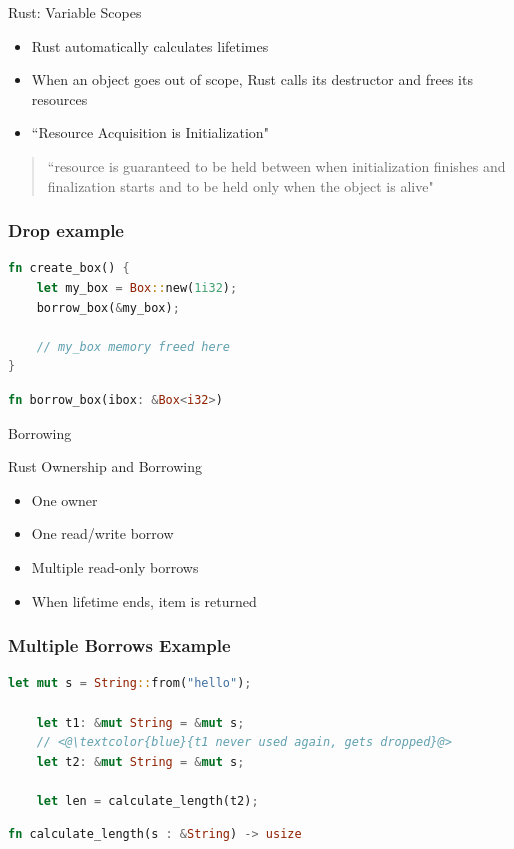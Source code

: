 \documentclass{beamer}
\begin{document}
\begin{frame}{Rust: Variable Scopes}
\begin{block}{} 
\begin{itemize}
\item Rust automatically calculates lifetimes
\item When an object goes out of scope, Rust calls its destructor and frees its resources
\item ``Resource Acquisition is Initialization" 
\end{itemize}
\end{block}
\begin{quote}
``resource is guaranteed to be held between when initialization finishes and finalization starts 
and to be held only when the object is alive"
\end{quote}
\end{frame}


\begin{frame}[fragile]
\frametitle{Drop example}


\begin{block}{}
\begin{lstlisting}[language=Rust]
fn create_box() {
    let my_box = Box::new(1i32);
    borrow_box(&my_box);

    // my_box memory freed here
}
\end{lstlisting}

\end{block}
\begin{lstlisting}[language=Rust]
fn borrow_box(ibox: &Box<i32>)
\end{lstlisting}
\end{frame}


\begin{frame}{Borrowing}
\begin{block}{Rust Ownership and Borrowing}
\begin{itemize} 
	\item One owner
	\item One read/write borrow
	\item Multiple read-only borrows
	\item When lifetime ends, item is returned
\end{itemize} 
\end{block}
\end{frame}

\begin{frame}[fragile]
\frametitle{Multiple Borrows Example}
\begin{block}{}
\begin{lstlisting}[language=Rust]
    let mut s = String::from("hello");
    
    let t1: &mut String = &mut s;
    // <@\textcolor{blue}{t1 never used again, gets dropped}@>
    let t2: &mut String = &mut s;

    let len = calculate_length(t2);
 \end{lstlisting}
\end{block}
\begin{lstlisting}[language=Rust]
fn calculate_length(s : &String) -> usize
\end{lstlisting}
\end{frame}
\end{document}
